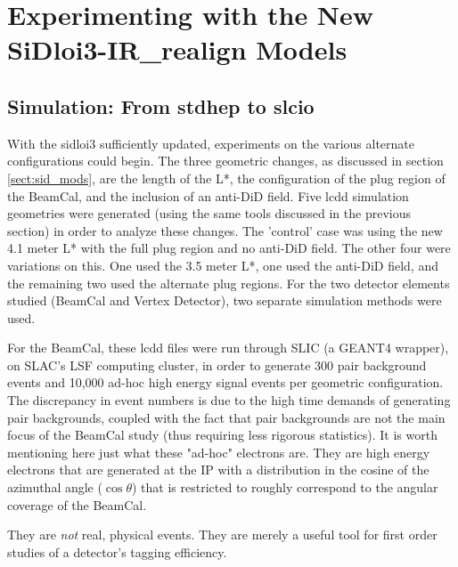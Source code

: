 \documentclass{report}
\begin{document}
        \section{Experimenting with the New SiDloi3-IR\_realign Models}

            \subsection{Simulation: From stdhep to slcio}
                With the sidloi3 sufficiently updated, experiments on the various alternate configurations could begin. The three geometric changes, as discussed in section \ref{sect:sid_mods}, are the length of the L*, the configuration of the plug region of the BeamCal, and the inclusion of an anti-DiD field. Five lcdd simulation geometries were generated (using the same tools discussed in the previous section) in order to analyze these changes. The 'control' case was using the new 4.1 meter L* with the full plug region and no anti-DiD field. The other four were variations on this. One used the 3.5 meter L*, one used the anti-DiD field, and the remaining two used the alternate plug regions. For the two detector elements studied (BeamCal and Vertex Detector), two separate simulation methods were used. 

                For the BeamCal, these lcdd files were run through SLIC (a GEANT4 wrapper), on SLAC's LSF computing cluster, in order to generate 300 pair background events and 10,000 ad-hoc high energy signal events per geometric configuration. The discrepancy in event numbers is due to the high time demands of generating pair backgrounds, coupled with the fact that pair backgrounds are not the main focus of the BeamCal study (thus requiring less rigorous statistics). It is worth mentioning here just what these "ad-hoc" electrons are. They are high energy electrons that are generated at the IP with a distribution in the cosine of the azimuthal angle ($\cos\theta$) that is restricted to roughly correspond to the angular coverage of the BeamCal.
                
                They are \textit{not} real, physical events. They are merely a useful tool for first order studies of a detector's tagging efficiency.
\end{document}
